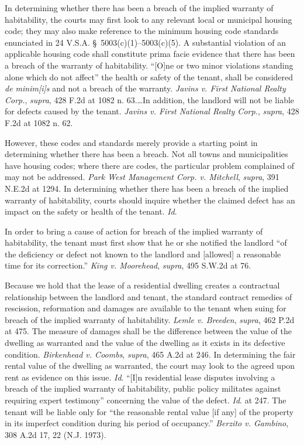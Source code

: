 In determining whether there has been a breach of the implied warranty of
habitability, the courts may first look to any relevant local or municipal
housing code; they may also make reference to the minimum housing code
standards enunciated in 24 V.S.A. \S~5003(c)(1)--5003(c)(5). A substantial
violation of an applicable housing code shall constitute prima facie evidence
that there has been a breach of the warranty of habitability. ``[O]ne or two
minor violations standing alone which do not affect'' the health or safety of
the tenant, shall be considered \textit{de minim[i]s} and not a breach of the
warranty. \textit{Javins v. First National Realty Corp.}, \textit{supra}, 428
F.2d at 1082 n. 63.\ldots In addition, the landlord will not be liable for
defects caused by the tenant. \textit{Javins v. First National Realty Corp.},
\textit{supra}, 428 F.2d at 1082 n. 62.

However, these codes and standards merely provide a starting point in
determining whether there has been a breach. Not all towns and municipalities
have housing codes; where there are codes, the particular problem complained of
may not be addressed. \textit{Park West Management Corp. v. Mitchell},
\textit{supra}, 391 N.E.2d at 1294. In determining whether there has been a
breach of the implied warranty of habitability, courts should inquire whether
the claimed defect has an impact on the safety or health of the tenant.
\textit{Id}.

In order to bring a cause of action for breach of the implied warranty of
habitability, the tenant must first show that he or she notified the landlord
``of the deficiency or defect not known to the landlord and [allowed] a
reasonable time for its correction.'' \textit{King v. Moorehead},
\textit{supra}, 495 S.W.2d at 76.

Because we hold that the lease of a residential dwelling creates a contractual
relationship between the landlord and tenant, the standard contract remedies of
rescission, reformation and damages are available to the tenant when suing for
breach of the implied warranty of habitability. \textit{Lemle v. Breeden},
\textit{supra}, 462 P.2d at 475. The measure of damages shall be the difference
between the value of the dwelling as warranted and the value of the dwelling as
it exists in its defective condition. \textit{Birkenhead v. Coombs},
\textit{supra}, 465 A.2d at 246. In determining the fair rental value of the
dwelling as warranted, the court may look to the agreed upon rent as evidence
on this issue. \textit{Id}. ``[I]n residential lease disputes involving a
breach of the implied warranty of habitability, public policy militates against
requiring expert testimony'' concerning the value of the defect. \textit{Id}.
at 247. The tenant will be liable only for ``the reasonable rental value [if
any] of the property in its imperfect condition during his period of
occupancy.'' \textit{Berzito v. Gambino}, 308 A.2d 17, 22 (N.J. 1973).

